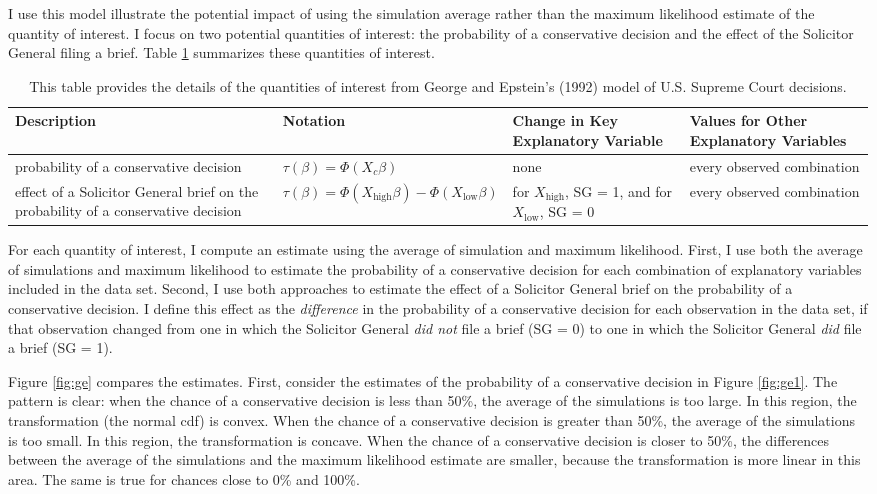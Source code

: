 \documentclass[10pt]{article}
\begin{document}
I use this model illustrate the potential impact of using the simulation average rather than the maximum likelihood estimate of the quantity of interest. 
I focus on two potential quantities of interest: the probability of a conservative decision and the effect of the Solicitor General filing a brief. 
Table \ref{tab:ge-qi} summarizes these quantities of interest. 

\begin{table}[]
\centering
\caption{This table provides the details of the quantities of interest from George and Epstein's (1992) model of U.S. Supreme Court decisions.}
\label{tab:ge-qi}
\footnotesize
\begin{tabular}{@{} m{5cm} m{4cm} m{2.5cm}m{4cm}@{}}
\toprule
Description                                                                       & Notation                                                  & Change in Key Explanatory Variable               & Values for Other Explanatory Variables \\ \midrule
probability of a conservative decision                                            & $\tau(\beta) = \Phi(X_c \beta)$                           & none                                             & every observed combination   \\\hline
effect of a Solicitor General brief on the probability of a conservative decision & $\tau(\beta) = \Phi(X_\text{high} \beta) - \Phi(X_\text{low}\beta)$ & for $X_\text{high}$, SG = 1, and for $X_\text{low}$, SG = 0 & every observed combination   \\ \bottomrule
\end{tabular}
\end{table}

For each quantity of interest, I compute an estimate using the average of simulation and maximum likelihood.
First, I use both the average of simulations and maximum likelihood to estimate the probability of a conservative decision for each combination of explanatory variables included in the data set. 
Second, I use both approaches to estimate the effect of a Solicitor General brief on the probability of a conservative decision. 
I define this effect as the \textit{difference} in the probability of a conservative decision for each observation in the data set, if that observation changed from one in which the Solicitor General \emph{did not} file a brief (SG = 0) to one in which the Solicitor General \emph{did} file a brief (SG = 1).

Figure \ref{fig:ge} compares the estimates. 
First, consider the estimates of the probability of a conservative decision in Figure \ref{fig:ge1}.
The pattern is clear: when the chance of a conservative decision is less than 50\%, the average of the simulations is too large. 
In this region, the transformation (the normal cdf) is convex. 
When the chance of a conservative decision is greater than 50\%, the average of the simulations is too small. 
In this region, the transformation is concave. 
When the chance of a conservative decision is closer to 50\%, the differences between the average of the simulations and the maximum likelihood estimate are smaller, because the transformation is more linear in this area. 
The same is true for chances close to 0\% and 100\%.
\end{document}
